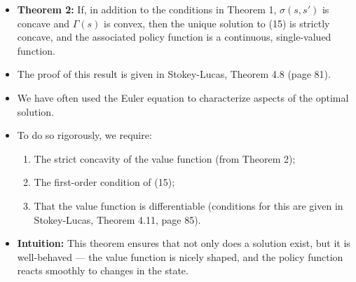 \documentclass[12pt]{article}
\begin{document}
\begin{itemize}
\item \textbf{Theorem 2:} If, in addition to the conditions in Theorem 1, $\sigma(s, s')$ is concave and $\Gamma(s)$ is convex, then the unique solution to (15) is strictly concave, and the associated policy function is a continuous, single-valued function.

\item The proof of this result is given in Stokey-Lucas, Theorem 4.8 (page 81).

\item We have often used the Euler equation to characterize aspects of the optimal solution.

\item To do so rigorously, we require:
\begin{enumerate}[label=(\alph*)]
    \item The strict concavity of the value function (from Theorem 2);
    \item The first-order condition of (15);
    \item That the value function is differentiable (conditions for this are given in Stokey-Lucas, Theorem 4.11, page 85).
\end{enumerate}

\item \textbf{Intuition:} This theorem ensures that not only does a solution exist, but it is well-behaved — the value function is nicely shaped, and the policy function reacts smoothly to changes in the state.
\end{itemize}
\end{document}
